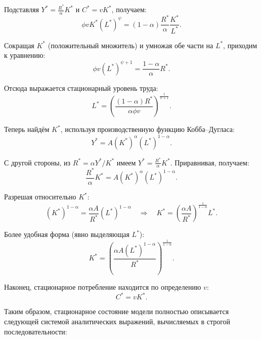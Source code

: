 \documentclass[12pt,a4paper]{report}   %
\begin{document}
            Подставляя $Y^* = \frac{R^*}{\alpha}K^*$ и $C^* = v K^*$, получаем:
            \[
            \phi v K^* (L^*)^{\psi} = (1-\alpha)\frac{R^*}{\alpha}\frac{K^*}{L^*}.
            \]

            Сокращая $K^*$ (положительный множитель) и умножая обе части на $L^*$, приходим к уравнению:
            \[
            \phi v (L^*)^{\psi+1} = \frac{1-\alpha}{\alpha}R^*.
            \]

            Отсюда выражается стационарный уровень труда:
            \begin{equation}
            L^* = \left( \frac{(1-\alpha)R^*}{\alpha \phi v} \right)^{\frac{1}{\psi+1}}. \tag{3.3}
            \end{equation}


            Теперь найдём $K^*$, используя производственную функцию Кобба–Дугласа:
            \[
            Y^* = A (K^*)^{\alpha} (L^*)^{1-\alpha}.
            \]

            С другой стороны, из $R^* = \alpha Y^*/K^*$ имеем $Y^* = \frac{R^*}{\alpha}K^*$. Приравнивая, получаем:
            \[
            \frac{R^*}{\alpha}K^* = A (K^*)^{\alpha} (L^*)^{1-\alpha}.
            \]

            Разрешая относительно $K^*$:
            \[
            (K^*)^{1-\alpha} = \frac{\alpha A}{R^*} (L^*)^{1-\alpha}
            \quad\Longrightarrow\quad
            K^* = \left( \frac{\alpha A}{R^*} \right)^{\frac{1}{1-\alpha}} L^*.
            \]

            Более удобная форма (явно выделяющая $L^*$):
            \begin{equation}
            K^* = \left( \frac{\alpha A (L^*)^{1-\alpha}}{R^*} \right)^{\frac{1}{1-\alpha}}. \tag{3.4}
            \end{equation}

            Наконец, стационарное потребление находится по определению $v$:
            \begin{equation}
            C^* = v K^*. \tag{3.5}
            \end{equation}


            Таким образом, стационарное состояние модели полностью описывается следующей системой аналитических выражений, вычисляемых в строгой последовательности:
\end{document}
